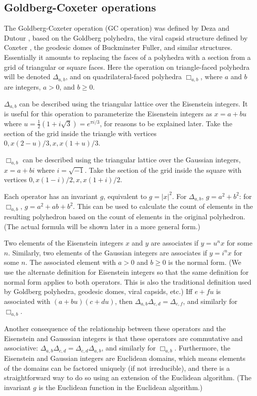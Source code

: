 \documentclass{amsart}[12pt]
\begin{document}
\subsection{Goldberg-Coxeter operations}
The Goldberg-Coxeter operation (GC operation) was defined by Deza and
Dutour \cite{Deza2004}, based on the Goldberg polyhedra, the viral capsid
structure defined by Coxeter \cite{Coxeter}, the geodesic domes of Buckminster
Fuller, and similar structures. Essentially it amounts to replacing the faces of
a polyhedra with a section from a grid of triangular or square faces. Here the
operation on triangle-faced polyhedra will be denoted $\Delta_{a,b}$, and on
quadrilateral-faced polyhedra $\Box_{a,b}$, where $a$ and $b$ are integers,
$a > 0$, and $b \ge 0$.

$\Delta_{a,b}$ can be described using the triangular lattice over the
Eisenstein integers. It is useful for this operation to parameterize the
Eisenstein integers as $x = a + bu$ where $u = \frac{1}{2}(1 + i\sqrt 3) =
e^{\pi i/3}$, for reasons to be explained later. Take the section of the grid
inside the triangle with vertices $0, x(2-u)/3, x, x(1+u)/3$.

$\Box_{a,b}$ can be described using the triangular lattice over the Gaussian
integers, $x = a + bi$ where $i = \sqrt{-1}$. Take the section of the grid
inside the square with vertices $0, x(1-i)/2, x, x(1+i)/2$.

Each operator has an invariant $g$, equivalent to $g = |x|^2$. For
$\Delta_{a,b}$, $g = a^2 + b^2$: for $\Box_{a,b}$, $g = a^2 + ab + b^2$. This
can be used to calculate the count of elements in the resulting polyhedron
based on the count of elements in the original polyhedron. (The actual formula
will be shown later in a more general form.)

Two elements of the Eisenstein integers $x$ and $y$ are associates if
$y = u^n x$ for some $n$. Similarly, two elements of the Gaussian integers are
associates if $y = i^n x$ for some $n$. The associated element with $a>0$ and
$b\ge 0$ is the normal form. (We use the alternate definition for Eisenstein
integers so that the same definition for normal form applies to both operators.
This is also the traditional definition used by Goldberg polyhedra, geodesic
domes, viral capsids, etc.) Iff $e+fu$ is associated with $(a+bu)(c+du)$, then
$\Delta_{a,b}\Delta_{c,d} = \Delta_{e,f}$, and similarly for $\Box_{a,b}$.

Another consequence of the relationship between these operators and the
Eisenstein and Gausssian integers is that these operators are commutative and
associative: $\Delta_{a,b}\Delta_{c,d} = \Delta_{c,d}\Delta_{a,b}$, and
similarly for $\Box_{a,b}$. Furthermore, the Eisenstein and Gaussian integers
are Euclidean domains, which means elements of the domains can be factored
uniquely (if not irreducible), and there is a straightforward way to do so
using an extension of the Euclidean algorithm. (The invariant $g$ is the
Euclidean function in the Euclidean algorithm.)
\end{document}
